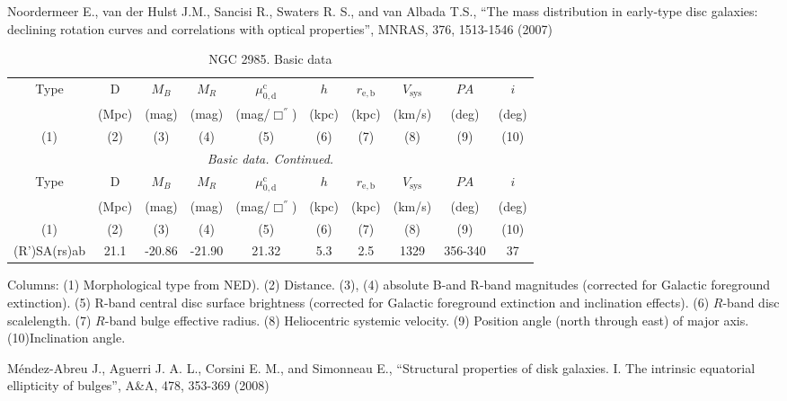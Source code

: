 \documentclass[english,10pt]{article}
\def\mm{\mathrm}
\begin{document}
\bigskip
\noindent
Noordermeer E., van der Hulst J.M., Sancisi R., 
Swaters R. S., and van Albada T.S., 
``The mass distribution in early-type disc galaxies: declining rotation
curves and correlations with optical properties'', 
MNRAS, 376, 1513-1546 (2007)

\begin{longtable}[c]{cccccccccc}
\caption{NGC 2985. Basic data} \\ 
\hline 
Type & D & $M_B$ & $M_R$ & $\mu_\mm{0,d}^\mm{c}$ & $h$ & $r_\mm{e,b}$
& $V_\mm{sys}$ & $PA$ & $i$ \\ 
& (Mpc) & (mag) & (mag) & (mag/$\Box^{''}$) & (kpc) & (kpc)
& (km/s) & (deg) & (deg) \\
(1)&(2)&(3)&(4)&(5)&(6)&(7)&(8)&(9)&(10) \\ 
\hline
\endfirsthead 
\hline
\multicolumn{10}{c}{\small\slshape Basic data. 
Continued. } \\ \hline
Type & D & $M_B$ & $M_R$ & $\mu_\mm{0,d}^\mm{c}$ & $h$ & $r_\mm{e,b}$
& $V_\mm{sys}$ & $PA$ & $i$ \\ 
& (Mpc) & (mag) & (mag) & (mag/$\Box^{''}$) & (kpc) & (kpc)
& (km/s) & (deg) & (deg) \\
(1)&(2)&(3)&(4)&(5)&(6)&(7)&(8)&(9)&(10) \\ 
\hline
\endhead 
\hline
(R’)SA(rs)ab & 21.1 & -20.86 & -21.90 & 21.32 & 5.3 & 2.5 
& 1329 & 356-340 & 37 \tabularnewline
\hline
\end{longtable}

Columns: 
(1) Morphological type from NED). 
(2) Distance. 
(3), (4) absolute B-and R-band magnitudes 
(corrected for Galactic foreground extinction).
(5) R-band central disc surface brightness 
(corrected for Galactic foreground extinction and inclination effects).
(6) $R$-band disc scalelength.
(7) $R$-band bulge effective radius.
(8) Heliocentric systemic velocity.
(9) Position angle (north through east) of major axis. 
(10)Inclination angle.

\bigskip
\noindent
M\'{e}ndez-Abreu J., Aguerri J. A. L., Corsini E. M., 
and Simonneau E., 
``Structural properties of disk galaxies. I. The intrinsic 
equatorial ellipticity of bulges'', 
A\&A, 478, 353-369 (2008)
\end{document}
